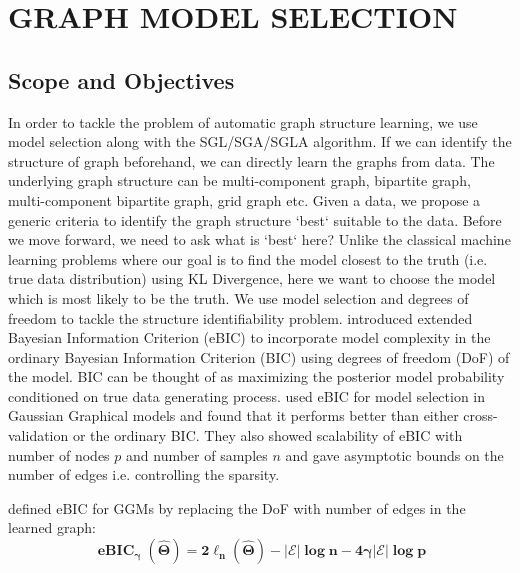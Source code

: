 \chapter{GRAPH MODEL SELECTION}
\label{chap:gms}

\section{Scope and Objectives}
In order to tackle the problem of automatic graph structure learning, we use model selection along with the SGL/SGA/SGLA algorithm. If we can identify the structure of graph beforehand, we can directly learn the graphs from data.  The underlying graph structure can be multi-component graph, bipartite graph, multi-component bipartite graph, grid graph etc. Given a data, we propose a generic criteria to identify the graph structure `best` suitable to the data. Before we move forward, we need to ask what is `best` here? Unlike the classical machine learning problems where our goal is to find the model closest to the truth (i.e. true data distribution) using KL Divergence, here we want to choose the model which is most likely to be the truth. We use model selection and degrees of freedom to tackle the structure identifiability problem. \cite{chen2008extended} introduced extended Bayesian Information Criterion (eBIC) to incorporate model complexity in the ordinary Bayesian Information Criterion (BIC) using degrees of freedom (DoF) of the model. BIC can be thought of as maximizing the posterior model probability conditioned on true data generating process. \cite{foygel2010extended} used eBIC for model selection in Gaussian Graphical models and found that it performs better than either cross-validation or the ordinary BIC. They also showed scalability of eBIC with number of nodes $p$ and number of samples $n$ and gave asymptotic bounds on the number of edges i.e. controlling the sparsity. 
 
\cite{foygel2010extended} defined eBIC for GGMs by replacing the DoF with number of edges in the learned graph: 
\begin{equation}
\mathbf{\operatorname{eBIC}_{\gamma}(\hat{\Theta})=2 \ell_{n}(\hat{\Theta})-|\mathcal{E}| \log n-4 \gamma|\mathcal{E}| \log p}
\end{equation}

